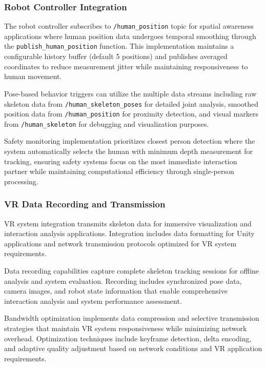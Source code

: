 \subsubsection{Robot Controller Integration}

The robot controller subscribes to \texttt{/human\_position} topic for spatial awareness applications where human position data undergoes temporal smoothing through the \texttt{publish\_human\_position} function. This implementation maintains a configurable history buffer (default 5 positions) and publishes averaged coordinates to reduce measurement jitter while maintaining responsiveness to human movement.

Pose-based behavior triggers can utilize the multiple data streams including raw skeleton data from \texttt{/human\_skeleton\_poses} for detailed joint analysis, smoothed position data from \texttt{/human\_position} for proximity detection, and visual markers from \texttt{/human\_skeleton} for debugging and visualization purposes.

Safety monitoring implementation prioritizes closest person detection where the system automatically selects the human with minimum depth measurement for tracking, ensuring safety systems focus on the most immediate interaction partner while maintaining computational efficiency through single-person processing.

\subsubsection{VR Data Recording and Transmission}

VR system integration transmits skeleton data for immersive visualization and interaction analysis applications. Integration includes data formatting for Unity applications and network transmission protocols optimized for VR system requirements.

Data recording capabilities capture complete skeleton tracking sessions for offline analysis and system evaluation. Recording includes synchronized pose data, camera images, and robot state information that enable comprehensive interaction analysis and system performance assessment.

Bandwidth optimization implements data compression and selective transmission strategies that maintain VR system responsiveness while minimizing network overhead. Optimization techniques include keyframe detection, delta encoding, and adaptive quality adjustment based on network conditions and VR application requirements.


